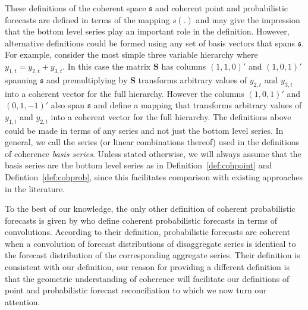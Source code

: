 \documentclass[a4paper, 11pt]{article}
\theoremstyle{theo}
\theoremstyle{definition}
\begin{document}
These definitions of the coherent space $\mathfrak{s}$ and coherent point and probabilistic forecasts are defined in terms of the mapping $s(.)$ and may give the impression that the bottom level series play an important role in the definition.  However, alternative definitions could be formed using any set of basis vectors that spans $\mathfrak{s}$. For example, consider the most simple three variable hierarchy where $y_{1,t}=y_{2,t}+y_{3,t}$.  In this case the matrix $\bm{S}$ has columns  $(1,1,0)'$ and $(1,0,1)'$ spanning $\mathfrak{s}$ and premultiplying by $\bm{S}$ transforms arbitrary values of $y_{2,t}$ and $y_{3,t}$ into a coherent vector for the full hierarchy.  However the columns $(1,0,1)'$ and $(0,1,-1)'$ also span $\mathfrak{s}$ and define a mapping that transforms arbitrary values of $y_{1,t}$ and $y_{2,t}$ into a coherent vector for the full hierarchy.  The definitions above could be made in terms of any series and not just the bottom level series.  In general, we call the series (or linear combinations thereof) used in the definitions of coherence \textit{basis series}.  Unless stated otherwise, we will always assume that the basis series are the bottom level series as in Definition~\ref{def:cohpoint} and Defintion~\ref{def:cohprob}, since this facilitates comparison with existing approaches in the literature.


To  the best of our knowledge, the only other definition of coherent probabilistic forecasts is given by \citet{BenTaieb2017} who define coherent probabilistic forecasts in terms of convolutions. According to their definition, probabilistic forecasts are coherent when a convolution of forecast distributions of disaggregate series is identical to the forecast distribution of the corresponding aggregate series.  Their definition is consistent with our definition, our reason for providing a different definition is that the geometric understanding of coherence will facilitate our definitions of point and probabilistic forecast reconciliation to which we now turn our attention.
\end{document}
